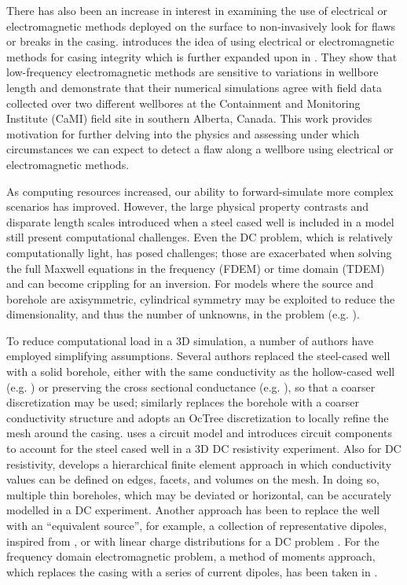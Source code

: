 There has also been an increase in interest in examining the use of electrical or electromagnetic methods deployed on the surface to non-invasively look for flaws or breaks in the casing. \cite{Wilt2018} introduces the idea of using electrical or electromagnetic methods for casing integrity which is further expanded upon in \cite{Wilt2018a}. They show that low-frequency electromagnetic methods are sensitive to variations in wellbore length and demonstrate that their numerical simulations agree with field data collected over two different wellbores at the Containment and Monitoring Institute (CaMI) field site in southern Alberta, Canada. This work provides motivation for further delving into the physics and assessing under which circumstances we can expect to detect a flaw along a wellbore using electrical or electromagnetic methods.

As computing resources increased, our ability to forward-simulate more complex scenarios has improved. However, the large physical property contrasts and disparate length scales introduced when a steel cased well is included in a model still present computational challenges. Even the DC problem, which is relatively computationally light, has posed challenges; those are exacerbated when solving the full Maxwell equations in the frequency (FDEM) or time domain (TDEM) and can become crippling for an inversion. For models where the source and borehole are axisymmetric, cylindrical symmetry may be exploited to reduce the dimensionality, and thus the number of unknowns, in the problem (e.g. \cite{Pardo2013, Heagy2015}).

To reduce computational load in a 3D simulation, a number of authors have employed simplifying assumptions. Several authors replaced the steel-cased well with a solid borehole, either with the same conductivity as the hollow-cased well (e.g. \cite{Um2015, Puzyrev2017}) or preserving the cross sectional conductance (e.g. \cite{Swidinsky2013, Kohnke2017}), so that a coarser discretization may be used; \cite{Haber2016} similarly replaces the borehole with a coarser conductivity structure and adopts an OcTree discretization to locally refine the mesh around the casing. \cite{Yang2016} uses a circuit model and introduces circuit components to account for the steel cased well in a 3D DC resistivity experiment. Also for DC resistivity, \cite{Weiss2017} develops a hierarchical finite element approach in which conductivity values can be defined on edges, facets, and volumes on the mesh. In doing so, multiple thin boreholes, which may be deviated or horizontal, can be accurately modelled in a DC experiment. Another approach has been to replace the well with an ``equivalent source'', for example, a collection of representative dipoles, inspired from \cite{cuevas2014}, or with linear charge distributions for a DC problem \citep{Weiss2016}. For the frequency domain electromagnetic problem, a method of moments approach, which replaces the casing with a series of current dipoles, has been taken in \cite{Kohnke2017}.

